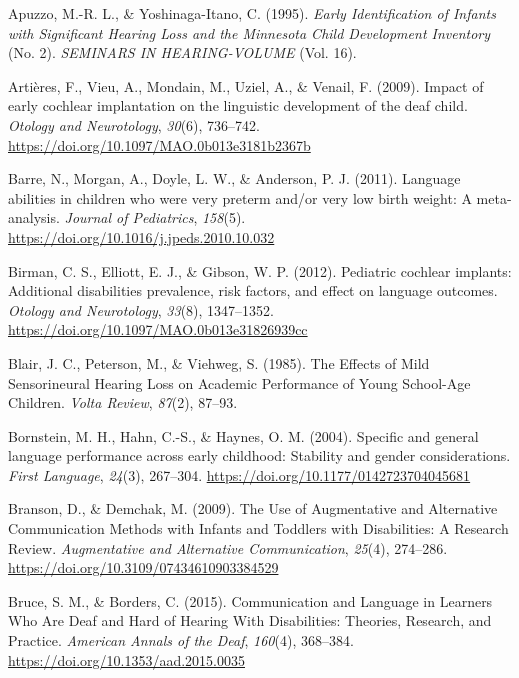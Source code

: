 \documentclass[english,man]{apa6}
\begin{document}
\leavevmode\hypertarget{ref-apuzzo1995}{}%
Apuzzo, M.-R. L., \& Yoshinaga-Itano, C. (1995). \emph{Early Identification of Infants with Significant Hearing Loss and the Minnesota Child Development Inventory} (No. 2). \emph{SEMINARS IN HEARING-VOLUME} (Vol. 16).

\leavevmode\hypertarget{ref-artieres2009}{}%
Artières, F., Vieu, A., Mondain, M., Uziel, A., \& Venail, F. (2009). Impact of early cochlear implantation on the linguistic development of the deaf child. \emph{Otology and Neurotology}, \emph{30}(6), 736--742. \url{https://doi.org/10.1097/MAO.0b013e3181b2367b}

\leavevmode\hypertarget{ref-barre2011}{}%
Barre, N., Morgan, A., Doyle, L. W., \& Anderson, P. J. (2011). Language abilities in children who were very preterm and/or very low birth weight: A meta-analysis. \emph{Journal of Pediatrics}, \emph{158}(5). \url{https://doi.org/10.1016/j.jpeds.2010.10.032}

\leavevmode\hypertarget{ref-birman2012}{}%
Birman, C. S., Elliott, E. J., \& Gibson, W. P. (2012). Pediatric cochlear implants: Additional disabilities prevalence, risk factors, and effect on language outcomes. \emph{Otology and Neurotology}, \emph{33}(8), 1347--1352. \url{https://doi.org/10.1097/MAO.0b013e31826939cc}

\leavevmode\hypertarget{ref-blair1985}{}%
Blair, J. C., Peterson, M., \& Viehweg, S. (1985). The Effects of Mild Sensorineural Hearing Loss on Academic Performance of Young School-Age Children. \emph{Volta Review}, \emph{87}(2), 87--93.

\leavevmode\hypertarget{ref-bornstein2004}{}%
Bornstein, M. H., Hahn, C.-S., \& Haynes, O. M. (2004). Specific and general language performance across early childhood: Stability and gender considerations. \emph{First Language}, \emph{24}(3), 267--304. \url{https://doi.org/10.1177/0142723704045681}

\leavevmode\hypertarget{ref-branson2009}{}%
Branson, D., \& Demchak, M. (2009). The Use of Augmentative and Alternative Communication Methods with Infants and Toddlers with Disabilities: A Research Review. \emph{Augmentative and Alternative Communication}, \emph{25}(4), 274--286. \url{https://doi.org/10.3109/07434610903384529}

\leavevmode\hypertarget{ref-bruce2015}{}%
Bruce, S. M., \& Borders, C. (2015). Communication and Language in Learners Who Are Deaf and Hard of Hearing With Disabilities: Theories, Research, and Practice. \emph{American Annals of the Deaf}, \emph{160}(4), 368--384. \url{https://doi.org/10.1353/aad.2015.0035}
\end{document}
